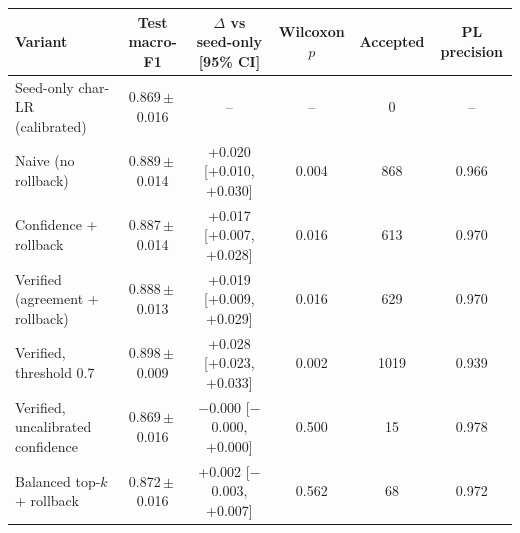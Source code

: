 \begin{tabular}{lccccc}
\toprule
Variant & Test macro-F1 & $\Delta$ vs seed-only [95\% CI] & Wilcoxon $p$ & Accepted & PL precision \\
\midrule
Seed-only char-LR (calibrated) & 0.869\,$\pm$\,0.016 & -- & -- & 0 & -- \\
\addlinespace
Naive (no rollback) & 0.889\,$\pm$\,0.014 & +0.020 [+0.010, +0.030] & 0.004 & 868 & 0.966 \\
Confidence + rollback & 0.887\,$\pm$\,0.014 & +0.017 [+0.007, +0.028] & 0.016 & 613 & 0.970 \\
Verified (agreement + rollback) & 0.888\,$\pm$\,0.013 & +0.019 [+0.009, +0.029] & 0.016 & 629 & 0.970 \\
Verified, threshold 0.7 & 0.898\,$\pm$\,0.009 & +0.028 [+0.023, +0.033] & 0.002 & 1019 & 0.939 \\
Verified, uncalibrated confidence & 0.869\,$\pm$\,0.016 & $-$0.000 [$-$0.000, +0.000] & 0.500 & 15 & 0.978 \\
Balanced top-$k$ + rollback & 0.872\,$\pm$\,0.016 & +0.002 [$-$0.003, +0.007] & 0.562 & 68 & 0.972 \\
\bottomrule
\end{tabular}
